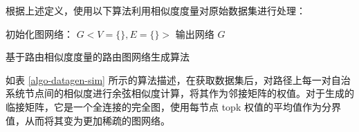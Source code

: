 根据上述定义，使用以下算法利用相似度度量对原始数据集进行处理：


\begin{algorithm}[H]
    初始化图网络：
    $G<V=\{\},E=\{\}>$\;
    输出网络 $G$\;
    \caption{基于路由相似度度量的路由图网络生成算法}
    \label{algo-datagen-sim}
\end{algorithm}

如表 \ref{algo-datagen-sim} 所示的算法描述，在获取数据集后，对路径上每一对自治系统节点间的相似度进行余弦相似度计算，将其作为邻接矩阵的权值。对于生成的临接矩阵，它是一个全连接的完全图，使用每节点 topk 权值的平均值作为分界值，从而将其变为更加稀疏的图网络。